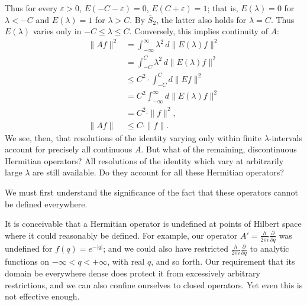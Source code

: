 \documentclass[fontsize=13pt,twoside,openany,headings=normal,parskip=false,bookmarkpackage=false,DIV=calc]{scrbook}
\begin{document}
Thus for every $\varepsilon>0$, $E(-C-\varepsilon)=0$, $E(C+\varepsilon)=1$; that is, $E(\lambda)=0$ for $\lambda<-C$ and $E(\lambda)=1$ for $\lambda>C$. By $\hyperref[cond:II.Sbar2]{\overline{S}_2}$, the latter also holds for $\lambda=C$. Thus $E(\lambda)$ varies only in $-C\leq\lambda\leq C$. Conversely, this implies continuity of $A$:
\begin{align*}
\|Af\|^2&=\int_{-\infty}^{\infty}\lambda^2\,d\|E(\lambda)f\|^2\\
&=\int_{-C}^C\lambda^2\,d\|E(\lambda)f\|^2\\
&\leq C^2\cdot\int_{-C}^C d\|Ef\|^2\\
&=C^2\int_{-\infty}^{\infty}d\|E(\lambda)f\|^2\\
&=C^2\cdot\|f\|^2,\\
\|Af\|&\leq C\cdot\|f\|.
\end{align*}
We see, then, that resolutions of the identity varying only within finite $\lambda$-intervals account for precisely all continuous $A$. But what of the remaining, discontinuous Hermitian operators? All resolutions of the identity which vary at arbitrarily large $\lambda$ are still available. Do they account for all these Hermitian operators?

We must first understand the significance of the fact that these operators cannot be defined everywhere.

It is conceivable that a Hermitian operator is undefined at points of Hilbert space where it could reasonably be defined. For example, our operator $A'=\frac{h}{2\pi i}\frac{\partial}{\partial q}$ was undefined for $f(q)=e^{-|q|}$; and we could also have restricted $\frac{h}{2\pi i}\frac{\partial}{\partial q}$ to analytic functions on $-\infty<q<+\infty$, with real $q$, and so forth. Our requirement that its domain be everywhere dense does protect it from excessively arbitrary restrictions, and we can also confine ourselves to closed operators. Yet even this is not effective enough.
\end{document}
